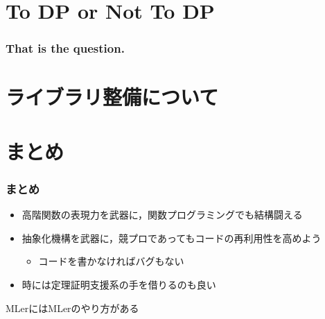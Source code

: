 \documentclass[dvipdfmx,cjk,xcolor=dvipsnames,envcountsect,notheorems,12pt]{beamer}
\theoremstyle{definition}
\begin{document}
\section{To DP or Not To DP\:}

\begin{frame}[fragile]
	\frametitle{That is the question.}

\end{frame}

\section{ライブラリ整備について}


\section{まとめ}

\begin{frame}
	\frametitle{まとめ}
	\begin{itemize}
		\item 高階関数の表現力を武器に，関数プログラミングでも結構闘える
		\item 抽象化機構を武器に，競プロであってもコードの再利用性を高めよう
			\begin{itemize}
				\item コードを書かなければバグもない
			\end{itemize}
		\item 時には定理証明支援系の手を借りるのも良い
	\end{itemize}
	\begin{center}
		{\LARGE MLerにはMLerのやり方がある}
	\end{center}
\end{frame}
\end{document}
